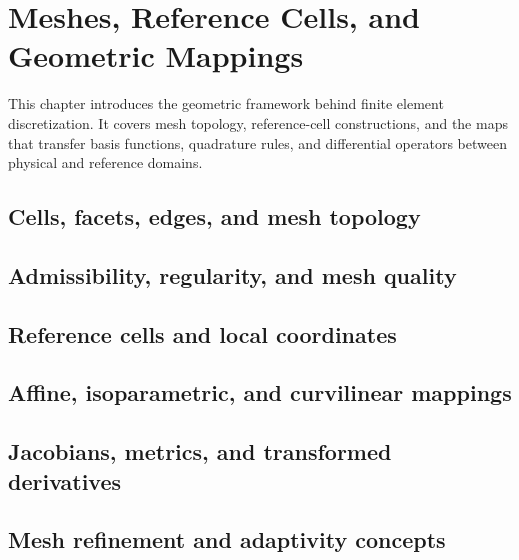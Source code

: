 \chapter{Meshes, Reference Cells, and Geometric Mappings}
\label{ch:meshes}

This chapter introduces the geometric framework behind finite element
discretization. It covers mesh topology, reference-cell constructions, and the
maps that transfer basis functions, quadrature rules, and differential
operators between physical and reference domains.

\section{Cells, facets, edges, and mesh topology}
\label{sec:meshes:topology}


\section{Admissibility, regularity, and mesh quality}
\label{sec:meshes:quality}


\section{Reference cells and local coordinates}
\label{sec:meshes:reference_cells}


\section{Affine, isoparametric, and curvilinear mappings}
\label{sec:meshes:mappings}


\section{Jacobians, metrics, and transformed derivatives}
\label{sec:meshes:jacobians}


\section{Mesh refinement and adaptivity concepts}
\label{sec:meshes:refinement}

